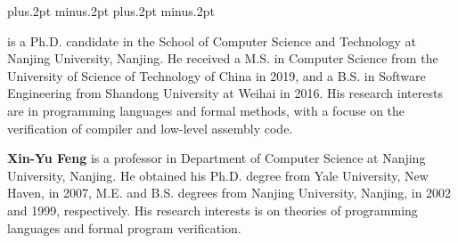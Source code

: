 \documentclass[twoside]{article}
\begin{document}
\begin{multicols}{2}

  \balance
  
  
  
  
  
  

  {
    \footnotesize
    \itemsep=-3pt plus.2pt minus.2pt
    \baselineskip=13pt plus.2pt minus.2pt
    }

    \vspace{5mm}

\noindent\parbox{8.3cm}
  {
  {\small{}  
  is a Ph.D. candidate in the School of Computer Science 
  and Technology at Nanjing University, Nanjing. 
  He received a M.S. in Computer Science from 
  the University of Science of Technology of China
  in 2019, 
  and a B.S. in Software Engineering from Shandong 
  University at Weihai in 2016. His research interests
  are in programming languages and formal methods, 
  with a focuse on the verification of compiler 
  and low-level assembly code.}\\[1mm]}

\noindent\parbox{8.3cm}
{
{\small\quad 
  {\bf Xin-Yu Feng}  
  is a professor in Department of Computer Science 
  at Nanjing University, Nanjing. He obtained his Ph.D. 
  degree from Yale University, New Haven, 
  in 2007, M.E. and B.S. 
  degrees from Nanjing University, 
  Nanjing, in 2002 and 1999, respectively. 
  His research interests is on theories 
  of programming languages and 
  formal program verification. }\\[1mm]}


\end{multicols}
\end{document}
